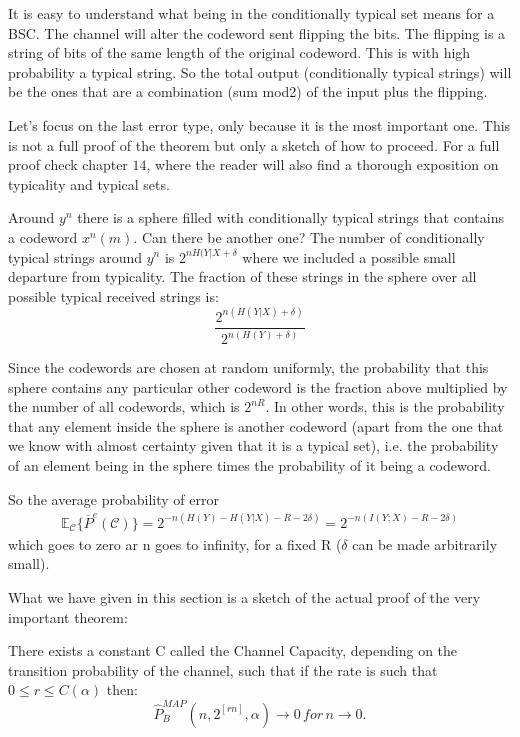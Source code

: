 It is easy to understand what being in the conditionally typical set means for a BSC. The channel will alter the codeword sent flipping the bits. The flipping is a string of bits of the same length of the original codeword. This is with high probability a typical string. So the total output (conditionally typical strings) will be the ones that are a combination (sum mod2) of the input plus the flipping.  

Let's focus on the last error type, only because it is the most important one. This is not a full proof of the theorem but only a sketch of how to proceed. For a full proof check \cite{wilde_2013} chapter $14$, where the reader will also find a thorough exposition on typicality and typical sets. 

Around $y^n$ there is a sphere filled with conditionally typical strings that contains a codeword $x^n(m)$. Can there be another one? The number of conditionally typical strings around $y^n$ is $2^{nH(Y|X + \delta}$ where we included a possible small departure from typicality. 
The fraction of these strings in the sphere over all possible typical received strings is:
\begin{equation}
\frac{2^{n(H(Y|X) + \delta)}}{2^{n(H(Y) + \delta)}}
\end{equation}

Since the codewords are chosen at random uniformly, the probability that this sphere contains any particular other codeword is the fraction above multiplied by the number of all codewords, which is  $2^{nR}$. In other words, this is the probability that any element inside the sphere is another codeword (apart from the one that we know with almost certainty given that it is a typical set), i.e.  the probability of an element being in the sphere times the probability of it being a codeword. 

So the average probability of error 
\begin{eqnarray}
\mathbb{E}_{\mathcal{C}}\{\overline{P}^e(\mathcal{C})\} =
2^{-n(H(Y) - H(Y|X) - R - 2\delta)} = 2^{-n(I(Y;X) - R - 2\delta)}
\end{eqnarray}
which goes to zero ar n goes to infinity, for a fixed R ($\delta$ can be made arbitrarily small).
 
What we have given  in this section is a sketch of the actual proof of the very important theorem:

\begin{theorem}
	There exists a constant C called the Channel Capacity, depending on the transition probability of the channel, such that if the rate is such that $0 \le r \le C(\alpha)$ then:
	\begin{equation}
		\hat{P}^{MAP}_B(n, 2^{[rn]}, \alpha) \rightarrow 0 \,for \, n \rightarrow 0.
	\end{equation} 
\end{theorem}

